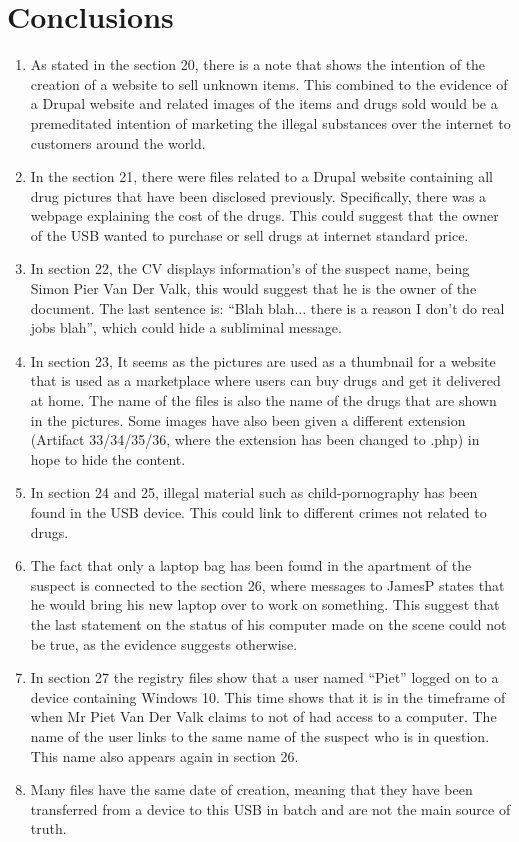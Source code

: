 \documentclass[11pt]{article}
\begin{document}
\section*{Conclusions}
\begin{enumerate}[resume]
    \item As stated in the section 20, there is a note that shows the intention of the creation of a website to sell unknown items. This combined to the evidence of a Drupal website and related images of the items and drugs sold would be a premeditated intention of marketing the illegal substances over the internet to customers around the world.
    \item In the section 21, there were files related to a Drupal website containing all drug pictures that have been disclosed previously. Specifically, there was a webpage explaining the cost of the drugs. This could suggest that the owner of the USB wanted to purchase or sell drugs at internet standard price.
    \item In section 22, the CV displays information’s of the suspect name, being Simon Pier Van Der Valk, this would suggest that he is the owner of the document. The last sentence is: “Blah blah... there is a reason I don’t do real jobs blah”, which could hide a subliminal message.
    \item In section 23, It seems as the pictures are used as a thumbnail for a website that is used as a marketplace where users can buy drugs and get it delivered at home. The name of the files is also the name of the drugs that are shown in the pictures. Some images have also been given a different extension (Artifact 33/34/35/36, where the extension has been changed to .php) in hope to hide the content.
    \item In section 24 and 25, illegal material such as child-pornography has been found in the USB device. This could link to different crimes not related to drugs.
    \item The fact that only a laptop bag has been found in the apartment of the suspect is connected to the section 26, where messages to JamesP states that he would bring his new laptop over to work on something. This suggest that the last statement on the status of his computer made on the scene could not be true, as the evidence suggests otherwise.
    \item In section 27 the registry files show that a user named “Piet” logged on to a device containing Windows 10. This time shows that it is in the timeframe of when Mr Piet Van Der Valk claims to not of had access to a computer. The name of the user links to the same name of the suspect who is in question. This name also appears again in section 26.
    \item Many files have the same date of creation, meaning that they have been transferred from a device to this USB in batch and are not the main source of truth.
\end{enumerate}
\end{document}
